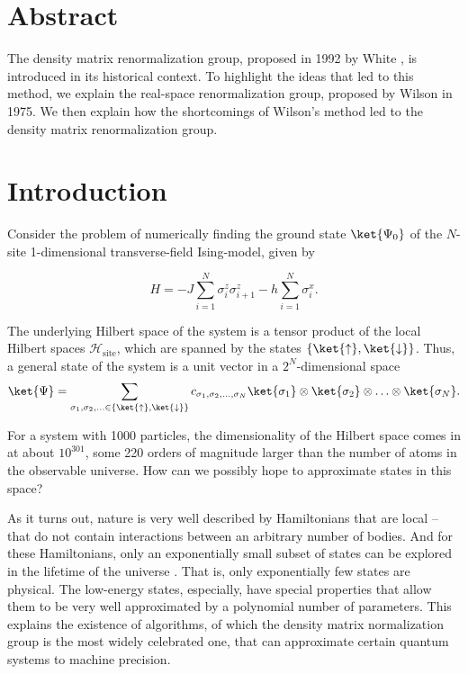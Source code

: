\section{Abstract}

The density matrix renormalization group, proposed in 1992 by White
\cite{white1992density}, is introduced in its historical context. To highlight the ideas
that led to this method, we explain the real-space renormalization group, proposed by
Wilson \cite{wilson1975renormalization} in 1975. We then explain how the shortcomings of
Wilson's method led to the density matrix renormalization group.

\section{Introduction}
Consider the problem of numerically finding the ground state $\ket{\Psi_0}$ of the
$N$-site 1-dimensional transverse-field Ising-model, given by

\begin{equation}
  H = -J \sum_{i = 1}^{N} \sigma_{i}^{z}\sigma_{i+1}^{z}
  - h \sum_{i=1}^{N} \sigma_{i}^{x}.
\end{equation}

The underlying Hilbert space of the system is a tensor product of the
local Hilbert spaces $\mathcal{H}_{\text{site}}$, which are spanned by the
states $\{\ket{\uparrow}, \ket{\downarrow}\}$. Thus, a general state of the system is a unit vector in
a $2^N$-dimensional space
\begin{equation}
  \ket{\Psi} = \sum_{\sigma_1, \sigma_2, \ldots \in \{\ket{\uparrow}, \ket{\downarrow}\}}
  c_{\sigma_1, \sigma_2, \ldots, \sigma_N} \ket{\sigma_1} \otimes \ket{\sigma_2} \otimes
  \ldots \otimes \ket{\sigma_N}.
\end{equation}

For a system with 1000 particles, the dimensionality of the Hilbert
space comes in at about $10^{301}$, some 220 orders of magnitude larger than the number of
atoms in the observable universe. How can we possibly hope to approximate states in this
space?

As it turns out, nature is very well described by Hamiltonians that are local -- that do
not contain interactions between an arbitrary number of bodies. And for these
Hamiltonians, only an exponentially small subset of states can be explored in the lifetime
of the universe \cite{poulin2011quantum}. That is, only exponentially few states are
physical. The low-energy states, especially, have special properties that allow them to be
very well approximated by a polynomial number of parameters. This explains the existence
of algorithms, of which the density matrix normalization group is the most widely
celebrated one, that can approximate certain quantum systems to machine precision.


